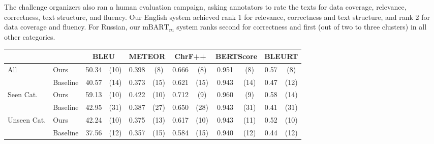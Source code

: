 \documentclass[12pt,notitlepage,a4paper,oneside,openany]{report}
\begin{document}
The challenge organizers also ran a human evaluation campaign, asking annotators to rate the texts for data coverage, relevance, correctness, text structure, and fluency. Our English system achieved rank 1 for relevance, correctness and text structure, and rank 2 for data coverage and fluency. For Russian, our $\text{mBART}_{\text{ru}}$ system ranks second for correctness and first (out of two to three clusters) in all other categories.


\begin{table}[t]
    \footnotesize\centering
    \begin{tabular}{llcccccccccc}\toprule
                                     &          & \multicolumn{2}{c}{\bf BLEU} & \multicolumn{2}{c}{\bf METEOR} & \multicolumn{2}{c}{\bf ChrF++} & \multicolumn{2}{c}{\bf BERTScore} & \multicolumn{2}{c}{\bf BLEURT}                                     \\\midrule
        \multirow{2}{*}{All}         & Ours     & 50.34                        & (10)                           & 0.398                          & (8)                               & 0.666                          & (8)  & 0.951 & (8)  & 0.57 & (8)  \\
                                     & Baseline & 40.57                        & (14)                           & 0.373                          & (15)                              & 0.621                          & (15) & 0.943 & (14) & 0.47 & (12) \\\midrule
        \multirow{2}{*}{Seen Cat.}   & Ours     & 59.13                        & (10)                           & 0.422                          & (10)                              & 0.712                          & (9)  & 0.960 & (9)  & 0.58 & (14) \\
                                     & Baseline & 42.95                        & (31)                           & 0.387                          & (27)                              & 0.650                          & (28) & 0.943 & (31) & 0.41 & (31) \\\midrule
        \multirow{2}{*}{Unseen Cat.} & Ours     & 42.24                        & (10)                           & 0.375                          & (13)                              & 0.617                          & (10) & 0.943 & (11) & 0.52 & (10) \\
                                     & Baseline & 37.56                        & (12)                           & 0.357                          & (15)                              & 0.584                          & (15) & 0.940 & (12) & 0.44 & (12) \\\midrule

\end{tabular}
\end{table}
\end{document}

